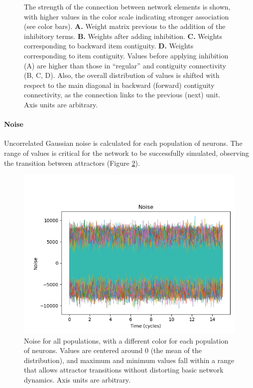 \begin{figure}
        \caption{
        The strength of the connection between network elements is shown, with higher values in the color scale indicating stronger association (see color bars).
        \textbf{A.} Weight matrix previous to the addition of the inhibitory terms.
        \textbf{B.} Weights after adding inhibition.
        \textbf{C.} Weights corresponding to backward item contiguity.
        \textbf{D.} Weights corresponding to item contiguity.
        Values before applying inhibition (A) are higher than those in ``regular'' and contiguity connectivity (B, C, D).
        Also, the overall distribution of values is shifted with respect to the main diagonal in backward (forward) contiguity connectivity, as the connection links to the previous (next) unit.
        Axis units are arbitrary.
        }
        \label{fig:weights}
    \end{figure}

    \paragraph{Noise}

    Uncorrelated Gaussian noise is calculated for each population of neurons.
    The range of values is critical for the network to be successfully simulated, observing the transition between attractors (Figure \ref{fig:noise}).

    \begin{figure}
        \includegraphics[width=\textwidth]{graphics/noise.png}
        \caption{
        Noise for all populations,
        with a different color for each population of neurons.
        Values are centered around 0 (the mean of the distribution), and maximum and minimum values fall within a range that allows attractor transitions without distorting basic network dynamics.
        Axis units are arbitrary.
        }
        \label{fig:noise}
    \end{figure}

